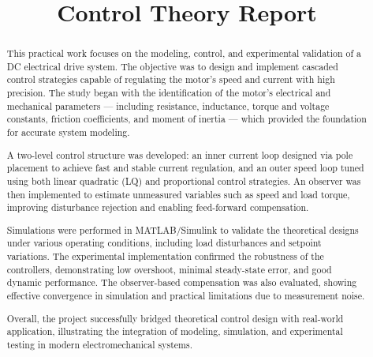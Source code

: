 \documentclass{rapportCS}
\title{Control Theory Report} %
\begin{document}






        
\fairemarges %
\fairepagedegarde %

\begin{center}
	\begin{abstract}
        This practical work focuses on the modeling, control, and experimental validation of a DC electrical drive system. The objective was to design and implement cascaded control strategies capable of regulating the motor’s speed and current with high precision. The study began with the identification of the motor’s electrical and mechanical parameters — including resistance, inductance, torque and voltage constants, friction coefficients, and moment of inertia — which provided the foundation for accurate system modeling.

A two-level control structure was developed: an inner current loop designed via pole placement to achieve fast and stable current regulation, and an outer speed loop tuned using both linear quadratic (LQ) and proportional control strategies. An observer was then implemented to estimate unmeasured variables such as speed and load torque, improving disturbance rejection and enabling feed-forward compensation.

Simulations were performed in MATLAB/Simulink to validate the theoretical designs under various operating conditions, including load disturbances and setpoint variations. The experimental implementation confirmed the robustness of the controllers, demonstrating low overshoot, minimal steady-state error, and good dynamic performance. The observer-based compensation was also evaluated, showing effective convergence in simulation and practical limitations due to measurement noise.

Overall, the project successfully bridged theoretical control design with real-world application, illustrating the integration of modeling, simulation, and experimental testing in modern electromechanical systems.
    \end{abstract}
\end{center}
\newpage
\end{document}
